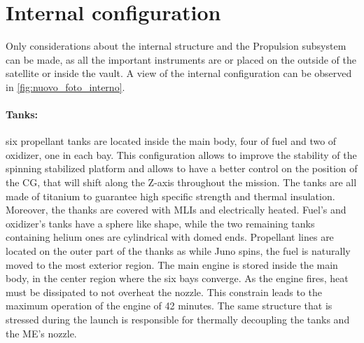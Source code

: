 \section{Internal configuration}
\label{sec:internal_config}

Only considerations about the internal structure and the Propulsion subsystem can be made, as all the important instruments are or placed on the outside of the satellite or inside the vault. A view of the internal configuration can be observed in \autoref{fig:nuovo_foto_interno}.
\vspace{-4mm}
\paragraph{Tanks:} six propellant tanks are located inside the main body, four of fuel and two of oxidizer, one in each bay. This configuration allows to improve the stability of the spinning stabilized platform and allows to have a better control on the position of the CG, that will shift along the Z-axis throughout the mission. The tanks are all made of titanium to guarantee high specific strength and thermal insulation.\cite{LL_early_cruise} Moreover, the thanks are covered with MLIs and electrically heated. Fuel's and oxidizer's tanks have a sphere like shape, while the two remaining tanks containing helium ones are cylindrical with domed ends. Propellant lines are located on the outer part of the thanks as while Juno spins, the fuel is naturally moved to the most exterior region. The main engine is stored inside the main body, in the center region where the six bays converge.\cite{Leros}\cite{Juno_launch} As the engine fires, heat must be dissipated to not overheat the nozzle. This constrain leads to the maximum operation of the engine of 42 minutes.\cite{Leros} The same structure that is stressed during the launch is responsible for thermally decoupling the tanks and the ME's nozzle. 

